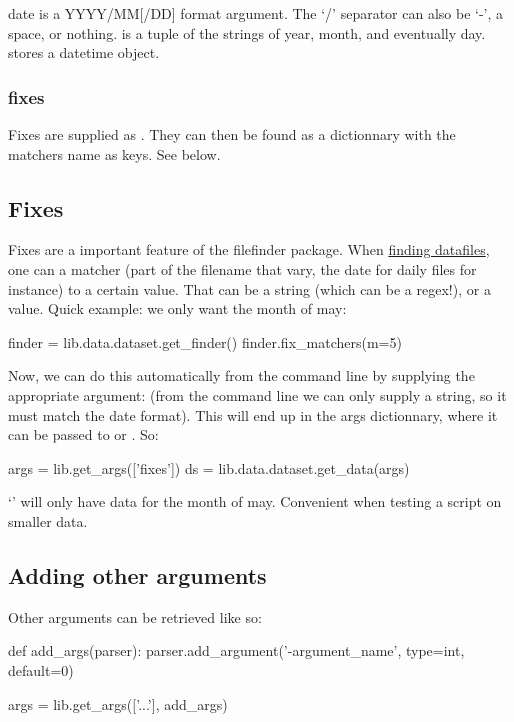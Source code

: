 date is a YYYY/MM[/DD] format argument. The `/' separator can also be `-', a space, or nothing.
 is a tuple of the strings of year, month, and eventually day\@.  stores a datetime object.

\subsubsection{fixes}
Fixes are supplied as . They can then be found as a dictionnary with the matchers name as keys. %
See  below.

\subsection{Fixes}
\label{sec:org-fixes}
Fixes are a important feature of the filefinder package.
When \hyperref[sec:org-preregex]{finding datafiles}, one can  a matcher (part of the filename that vary, the date for daily files for instance) to a certain value.
That can be a string (which can be a regex!), or a value. Quick example: we only want the month of may:
\begin{python}
finder = lib.data.dataset.get_finder()
finder.fix_matchers(m=5)
\end{python}

Now, we can do this automatically from the command line by supplying the appropriate argument:  (from the command line we can only supply a string, so it must match the date format). This will end up in the args dictionnary, where it can be passed to  or . So:
\begin{python}
args = lib.get_args(['fixes'])
ds = lib.data.dataset.get_data(args)
\end{python}
`' will only have data for the month of may. Convenient when testing a script on smaller data.

\subsection{Adding other arguments}
Other arguments can be retrieved like so:
\begin{python}
def add_args(parser):
    parser.add_argument('-argument_name', type=int, default=0)

args = lib.get_args(['...'], add_args)
\end{python}

